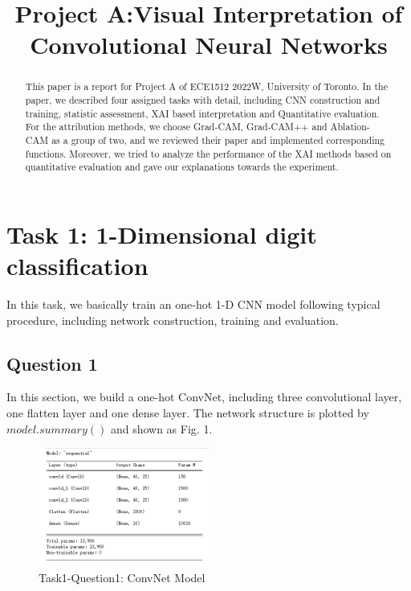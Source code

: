 \documentclass[conference]{IEEEtran}
\begin{document}
	
	
	\title{Project A:Visual Interpretation of Convolutional Neural Networks}
	\maketitle
	
	\begin{abstract}
		This paper is a report for Project A of ECE1512 2022W, University of Toronto. In the paper, we described four assigned tasks with detail, including CNN construction and training, statistic assessment, XAI based interpretation and Quantitative evaluation. For the attribution methods, we choose Grad-CAM, Grad-CAM++ and Ablation-CAM as a group of two, and we reviewed their paper and implemented corresponding functions. Moreover, we tried to analyze the performance of the XAI methods based on quantitative evaluation and gave our explanations towards the experiment.
	\end{abstract}
	
	\section{Task 1: 1-Dimensional digit classification}
	
	In this task, we basically train an one-hot 1-D CNN model following typical procedure, including network construction, training and evaluation.
	
	\subsection{Question 1}
	
	In this section, we build a one-hot ConvNet, including three convolutional layer, one flatten layer and one dense layer.
	The network structure is plotted by $model.summary()$ and shown as Fig. 1.
	
	\begin{figure}[h] 
		\centering
		\includegraphics[width=0.5\textwidth]{T1Q1.png}
		\caption{Task1-Question1: ConvNet Model}
		\label{Fig.t1q1}
	\end{figure}
	
\end{document}
